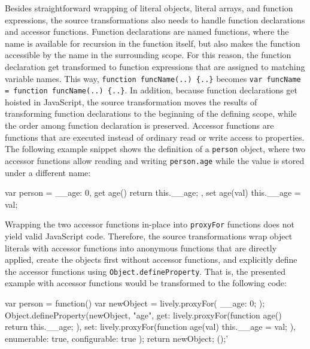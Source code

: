 Besides straightforward wrapping of literal objects, literal arrays, and function expressions, the source transformations also needs to handle function declarations and accessor functions.
Function declarations are named functions, where the name is available for recursion in the function itself, but also makes the function accessible by the name in the surrounding scope.
For this reason, the function declaration get transformed to function expressions that are assigned to matching variable names.
This way, \lstinline|function funcName(..) {..}| becomes \lstinline|var funcName = function funcName(..) {..}|.
In addition, because function declarations get hoisted in JavaScript, the source transformation moves the results of transforming function declarations to the beginning of the defining scope, while the order among function declaration is preserved.
Accessor functions are functions that are executed instead of ordinary read or write access to properties.
The following example snippet shows the definition of a \lstinline{person} object, where two accessor functions allow reading and writing \lstinline{person.age} while the value is stored under a different name: \\
\iffalse
\begin{verbatim}\fi
\begin{code}{}{}
var person = {
    __age: 0,
    get age() {
        return this.__age;
    },
    set age(val) {
        this.__age = val;
    }
}
\end{code}
\iffalse
\end{verbatim}\fi

Wrapping the two accessor functions in-place into \lstinline{proxyFor} functions does not yield valid JavaScript code.
Therefore, the source transformations wrap object literals with accessor functions into anonymous functions that are directly applied, create the objects first without accessor functions, and explicitly define the accessor functions using \lstinline{Object.defineProperty}.
That is, the presented example with accessor functions would be transformed to the following code: \\

\iffalse
\begin{verbatim}\fi
\begin{code}{}{}
var person = function() {
    var newObject = lively.proxyFor({
        __age: 0;
    });
    Object.defineProperty(newObject, "age", {
        get: lively.proxyFor(function age() {
            return this.__age;
        }),
        set: lively.proxyFor(function age(val) {
            this.__age = val;
        }),
        enumerable: true,
        configurable: true
    });
    return newObject;
}();'
\end{code}
\iffalse
\end{verbatim}\fi

